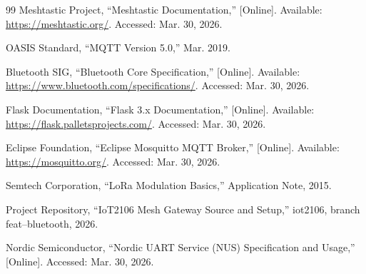 \documentclass[conference]{IEEEtran}
\begin{document}
\begin{thebibliography}{99}
 Meshtastic Project, ``Meshtastic Documentation,'' [Online]. Available: \url{https://meshtastic.org/}. Accessed: Mar. 30, 2026.

 OASIS Standard, ``MQTT Version 5.0,'' Mar. 2019.

 Bluetooth SIG, ``Bluetooth Core Specification,'' [Online]. Available: \url{https://www.bluetooth.com/specifications/}. Accessed: Mar. 30, 2026.

 Flask Documentation, ``Flask 3.x Documentation,'' [Online]. Available: \url{https://flask.palletsprojects.com/}. Accessed: Mar. 30, 2026.

 Eclipse Foundation, ``Eclipse Mosquitto MQTT Broker,'' [Online]. Available: \url{https://mosquitto.org/}. Accessed: Mar. 30, 2026.

 Semtech Corporation, ``LoRa Modulation Basics,'' Application Note, 2015.

 Project Repository, ``IoT2106 Mesh Gateway Source and Setup,'' iot2106, branch feat--bluetooth, 2026.

 Nordic Semiconductor, ``Nordic UART Service (NUS) Specification and Usage,'' [Online]. Accessed: Mar. 30, 2026.
\end{thebibliography}
\end{document}
